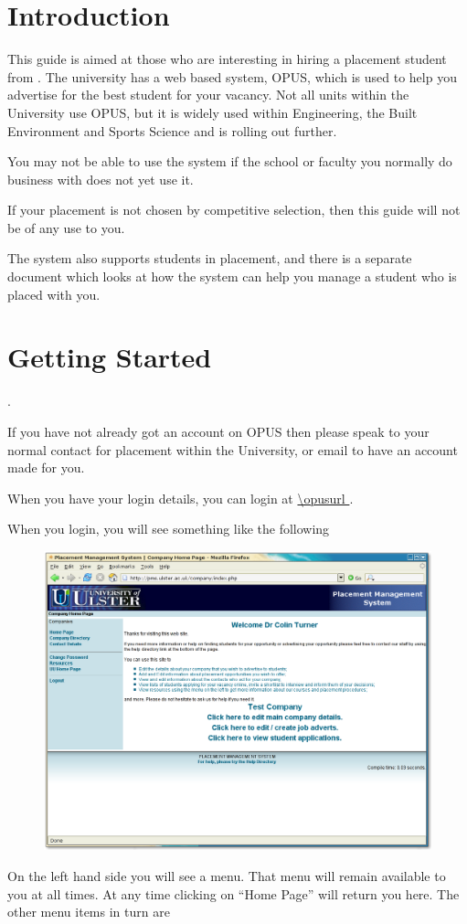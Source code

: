 \section{Introduction}

This guide is aimed at those who are interesting in hiring a placement student from \UniversityName.
The university has a web based system, OPUS,
which is used to help you advertise for the best student for your vacancy. Not
all units within the University use OPUS, but it is widely used within Engineering,
the Built Environment and Sports Science and is rolling out further.

You may not be able to use the system if the school or faculty you normally do business with
does not yet use it.

If your placement is not chosen by competitive selection, then this
guide will not be of any use to you.

The system also supports students in placement, and there is a separate document
which looks at how the system can help you manage a student who is placed with you.

\section{Getting Started}.

If you have not already got an account on OPUS then please speak to your normal contact
for placement within the University, or email
to have an account made for you.

When you have your login details, you can login at \url{\opusurl }.

When you login, you will see something like the following
\begin{figure}[htb]
\begin{center}
\includegraphics[scale=0.25]{png/company_hr1.png}
\end{center}
\end{figure}
On the left hand side you will see a menu. That menu will remain available to you
at all times. At any time clicking on ``Home Page'' will return you here. The other menu
items in turn are

